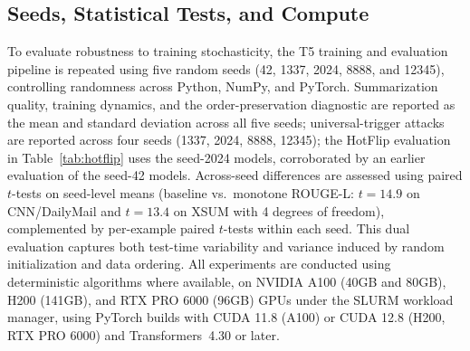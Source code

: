 \documentclass{article}
\theoremstyle{plain}
\theoremstyle{definition}
\theoremstyle{remark}
\begin{document}
\subsection{Seeds, Statistical Tests, and Compute}
To evaluate robustness to training stochasticity, the T5 training and evaluation pipeline is repeated using five random seeds (42, 1337, 2024, 8888, and 12345), controlling randomness across Python, NumPy, and PyTorch. Summarization quality, training dynamics, and the order-preservation diagnostic are reported as the mean and standard deviation across all five seeds; universal-trigger attacks are reported across four seeds (1337, 2024, 8888, 12345); the HotFlip evaluation in Table~\ref{tab:hotflip} uses the seed-2024 models, corroborated by an earlier evaluation of the seed-42 models.
Across-seed differences are assessed using paired $t$-tests on seed-level means (baseline vs.\ monotone ROUGE-L: $t = 14.9$ on CNN/DailyMail and $t = 13.4$ on XSUM with 4 degrees of freedom), complemented by per-example paired $t$-tests within each seed. This dual evaluation captures both test-time variability and variance induced by random initialization and data ordering. All experiments are conducted using deterministic algorithms where available, on NVIDIA A100 (40GB and 80GB), H200 (141GB), and RTX PRO 6000 (96GB) GPUs under the SLURM workload manager, using PyTorch builds with CUDA 11.8 (A100) or CUDA 12.8 (H200, RTX PRO 6000) and Transformers~4.30 or later.
\end{document}
